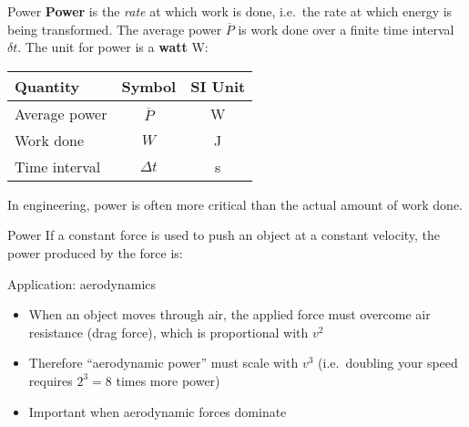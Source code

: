 \documentclass[12pt,compress,aspectratio=169]{beamer}
\newcommand{\mb}[1]{\ensuremath\mathbf{#1}}
\newcommand{\eq}[2]{\vspace{#1}{\Large\begin{displaymath}#2\end{displaymath}}}
\begin{document}
\begin{frame}{Power}
  \textbf{Power} is the \emph{rate} at which work is done, i.e.\ the rate at
  which energy is being transformed. The average power $\overline{P}$ is work
  done over a finite time interval $\delta t$. The unit for power is a
  \textbf{watt} \si{\watt}:

  \eq{-.15in}{
    \boxed{\overline{P} = \frac{W}{\Delta t}}
  }
  \begin{center}
    \begin{tabular}{l|c|c}
      \rowcolor{pink}
      \textbf{Quantity}  & \textbf{Symbol} & \textbf{SI Unit} \\ \hline
      Average power  & $\overline{P}$ & \si{\watt} \\
      Work done      & $W$            & \si{\joule} \\
      Time interval  & $\Delta t$     & \si{\second}
    \end{tabular}
  \end{center}
  In engineering, power is often more critical than the actual amount of work
  done.
\end{frame}



\begin{frame}{Power}
  If a constant force is used to push an object at a constant velocity, the
  power produced by the force is:
  
  \eq{-.1in}{
    P=\frac{W}{\Delta t}=\frac{\mb{F}\cdot\Delta\mb{x}}{\Delta t}
    =\mb{F}\cdot\frac{\Delta\mb{x}}{\Delta t}
    \quad\rightarrow\quad
    \boxed{P=\mb{F}\cdot\mb{v}}
  }
  
  Application: aerodynamics
  \begin{itemize}
  \item When an object moves through air, the applied force must overcome air
    resistance (drag force), which is proportional with $v^2$
    \item Therefore ``aerodynamic power'' must scale with $v^3$ (i.e.\ doubling
      your speed requires $2^3=8$ times more power)
    \item Important when aerodynamic forces dominate
  \end{itemize}
\end{frame}
\end{document}
